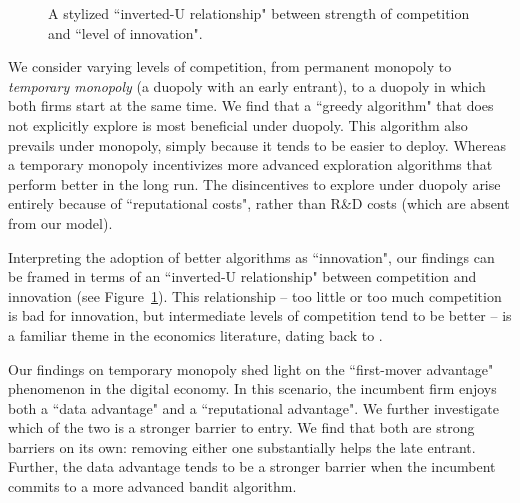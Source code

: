 \documentclass[../competing_bandits.tex]{subfiles}
\begin{document}
\begin{figure}
\begin{center}
 \caption{A stylized ``inverted-U relationship" between strength of competition and ``level of innovation".}
\label{fig:inverted-U}
\end{center}
\end{figure}

We consider varying levels of competition, from permanent monopoly to \emph{temporary monopoly} (a duopoly with an early entrant), to a duopoly in which both firms start at the same time. We find that a ``greedy algorithm" that does not explicitly explore is most beneficial under duopoly. This algorithm also prevails under monopoly, simply because it tends to be easier to deploy. Whereas a temporary monopoly incentivizes more advanced exploration algorithms that perform better in the long run. The disincentives to explore under duopoly arise entirely because of ``reputational costs", rather than R\&D costs (which are absent from our model).

Interpreting the adoption of better algorithms as ``innovation", our findings can be framed in terms of an ``inverted-U relationship" between competition and innovation (see Figure~\ref{fig:inverted-U}). This relationship -- too little or too much competition is bad for innovation, but intermediate levels of competition tend to be better -- is a familiar theme in the economics literature, dating back to \cite{Schumpeter-42}.

Our findings on temporary monopoly shed light on the ``first-mover advantage" phenomenon in the digital economy. In this scenario, the incumbent firm enjoys both a ``data advantage" and a ``reputational advantage". We further investigate which of the two is a stronger barrier to entry. We find that both are strong barriers on its own: removing either one substantially helps the late entrant. Further, the data advantage tends to be a stronger barrier when the incumbent commits to a more advanced bandit algorithm.
\end{document}
